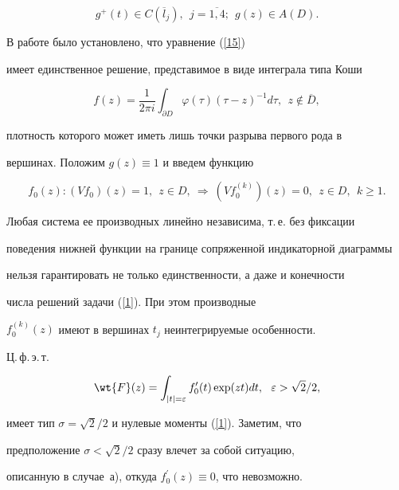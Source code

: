 \begin{equation}\label{neprer}


g^+(t)\in C(\overline l_j),\ \ j=\overline{1,4};\ \ g(z)\in A(D).


\end{equation}


В работе \cite{Avtor1} было установлено, что уравнение (\ref{15})


имеет единственное решение, представимое в виде интеграла типа Коши


\begin{equation}\label{coshi}


f(z)=\frac{1}{2\pi i}\int_{\partial D}


\varphi(\tau)(\tau-z)^{-1} d\tau,\ \ z\notin\overline D,


\end{equation}


плотность которого может иметь лишь точки разрыва первого рода в


вершинах. Положим $g(z){\equiv} 1$ и введем функцию


$$


f_0(z) : (Vf_0)(z)=1,\ \ z\in D,\ \Longrightarrow \ (Vf_0^{(k)})(z)=0,


\ \ z\in D,\ \ k\ge1.


$$


Любая система ее производных линейно независима, т.\,е. без фиксации


поведения нижней функции на границе сопряженной индикаторной диаграммы


нельзя гарантировать не только единственности, а даже и конечности


числа решений задачи (\ref{1}). При этом производные


$f_0^{(k)}(z)$ имеют в вершинах $t_j$ неинтегрируемые особенности.


Ц.\,ф.\,э.\,т.


$$


\wt{F}(z)=\int_{|t|=\varepsilon}f'_0(t)\exp(zt)dt,


\ \ \varepsilon >\sqrt2/2,


$$


имеет тип $\sigma=\sqrt2/2$ и нулевые моменты (\ref{1}). Заметим, что


предположение $\sigma<\sqrt2/2$ сразу влечет за собой ситуацию,


описанную в случае~а), откуда $f^\prime_0(z)\equiv 0$, что невозможно.






